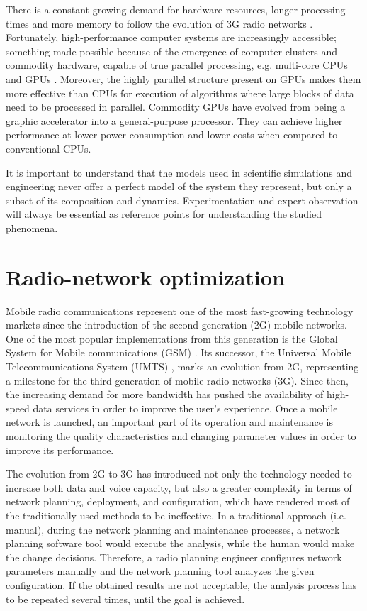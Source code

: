 There is a constant growing demand for hardware resources, longer-processing
times and more memory to follow the evolution of 3G radio networks
\cite{maple2004parallel,crainic2006tackling,soldani2007autonomic}.
Fortunately, high-performance computer systems are increasingly accessible;
something made possible because of the emergence of computer clusters
and commodity hardware, capable of true parallel processing, e.g.
multi-core CPUs \cite{gorder2007multicore} and GPUs \cite{wen2011gpu}.
Moreover, the highly parallel structure present on GPUs makes them
more effective than CPUs for execution of algorithms where large blocks
of data need to be processed in parallel. Commodity GPUs have evolved
from being a graphic accelerator into a general-purpose processor.
They can achieve higher performance at lower power consumption and
lower costs when compared to conventional CPUs.

It is important to understand that the models used in scientific simulations
and engineering never offer a perfect model of the system they represent,
but only a subset of its composition and dynamics. Experimentation
and expert observation will always be essential as reference points
for understanding the studied phenomena.


\section{Radio-network optimization}

Mobile radio communications represent one of the most fast-growing
technology markets since the introduction of the second generation
(2G) mobile networks. One of the most popular implementations from
this generation is the Global System for Mobile communications (GSM)
\cite{3GPP_TR_50.099}. Its successor, the Universal Mobile Telecommunications
System (UMTS) \cite{3GPP_TR_23.101}, marks an evolution from 2G,
representing a milestone for the third generation of mobile radio
networks (3G). Since then, the increasing demand for more bandwidth
has pushed the availability of high-speed data services in order to
improve the user's experience. Once a mobile network is launched,
an important part of its operation and maintenance is monitoring the
quality characteristics and changing parameter values in order to
improve its performance.

The evolution from 2G to 3G has introduced not only the technology
needed to increase both data and voice capacity, but also a greater
complexity in terms of network planning, deployment, and configuration,
which have rendered most of the traditionally used methods to be ineffective.
In a traditional approach (i.e. manual), during the network planning
and maintenance processes, a network planning software tool would
execute the analysis, while the human would make the change decisions.
Therefore, a radio planning engineer configures network parameters
manually and the network planning tool analyzes the given configuration.
If the obtained results are not acceptable, the analysis process has
to be repeated several times, until the goal is achieved.


